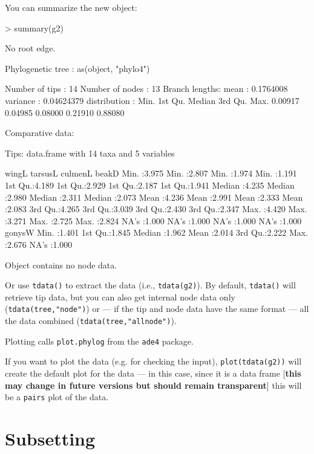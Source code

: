 \documentclass{article}
\newcommand{\code}[1]{{{\tt #1}}}
\begin{document}
You can summarize the new object:
\begin{Schunk}
\begin{Sinput}
> summary(g2)
\end{Sinput}
\begin{Soutput}
  No root edge.

 Phylogenetic tree : as(object, "phylo4") 

 Number of tips    : 14 
 Number of nodes   : 13 
 Branch lengths:
        mean         : 0.1764008 
        variance     : 0.04624379 
        distribution :
   Min. 1st Qu.  Median 3rd Qu.    Max. 
0.00917 0.04985 0.08000 0.21910 0.88080 

Comparative data:

Tips: data.frame with 14 taxa and 5 variables 

     wingL          tarsusL         culmenL          beakD      
 Min.   :3.975   Min.   :2.807   Min.   :1.974   Min.   :1.191  
 1st Qu.:4.189   1st Qu.:2.929   1st Qu.:2.187   1st Qu.:1.941  
 Median :4.235   Median :2.980   Median :2.311   Median :2.073  
 Mean   :4.236   Mean   :2.991   Mean   :2.333   Mean   :2.083  
 3rd Qu.:4.265   3rd Qu.:3.039   3rd Qu.:2.430   3rd Qu.:2.347  
 Max.   :4.420   Max.   :3.271   Max.   :2.725   Max.   :2.824  
 NA's   :1.000   NA's   :1.000   NA's   :1.000   NA's   :1.000  
     gonysW     
 Min.   :1.401  
 1st Qu.:1.845  
 Median :1.962  
 Mean   :2.014  
 3rd Qu.:2.222  
 Max.   :2.676  
 NA's   :1.000  

Object contains no node data.
\end{Soutput}
\end{Schunk}

Or use \code{tdata()} to extract the data (i.e., \code{tdata(g2)}). By default, \code{tdata()} will retrieve tip data, but you can also get internal node data only (\code{tdata(tree,"node")}) or --- if the tip and node data have the same format --- all the data combined (\code{tdata(tree,"allnode")}).

Plotting calls \code{plot.phylog} from the \code{ade4} package.

If you want to plot the data (e.g. for checking the input), \code{plot(tdata(g2))} will create the default plot for the data --- in this case, since it is a data frame [\textbf{this may change in future versions but should remain transparent}] this will be a \code{pairs} plot of the data.

\section{Subsetting}
\end{document}
